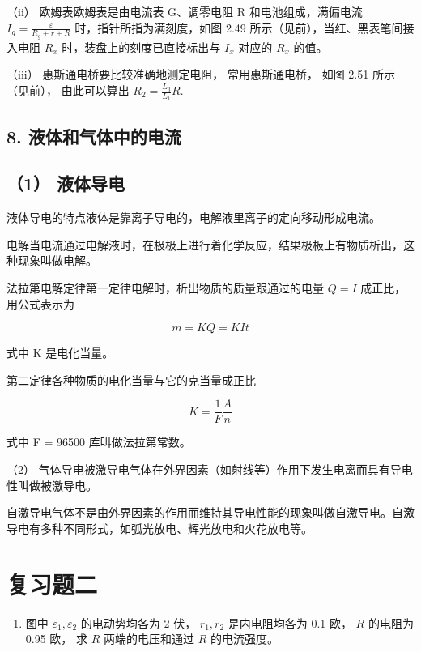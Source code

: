 （ii） 欧姆表欧姆表是由电流表 G、调零电阻 R 和电池组成，满偏电流
\(I_{g}=\frac{\varepsilon}{R_{g}+r+R}\) 时，指针所指为满刻度，如图 2.49
所示（见前），当红、黑表笔间接入电阻 \(R_{x}\)
时，装盘上的刻度已直接标出与 \(I_{x}\) 对应的 \(R_{x}\) 的值。

（iii） 惠斯通电桥要比较准确地测定电阻， 常用惠斯通电桥， 如图 2.51
所示（见前）， 由此可以算出 \(R_{2} = \frac{L_{3}}{L_{1}} R\).

\subsection{8.
液体和气体中的电流}\label{ux6db2ux4f53ux548cux6c14ux4f53ux4e2dux7684ux7535ux6d41-1}

\subsection{（1） 液体导电}\label{ux6db2ux4f53ux5bfcux7535}

液体导电的特点液体是靠离子导电的，电解液里离子的定向移动形成电流。

电解当电流通过电解液时，在极极上进行着化学反应，结果极板上有物质析出，这种现象叫做电解。

法拉第电解定律第一定律电解时，析出物质的质量跟通过的电量 \(Q = I\)
成正比，用公式表示为

\[
m = K Q = K I t
\]

式中 K 是电化当量。

第二定律各种物质的电化当量与它的克当量成正比

\[
K = \frac{1}{F} \frac{A}{n}
\]

式中 F = 96500 库叫做法拉第常数。

（2）
气体导电被激导电气体在外界因素（如射线等）作用下发生电离而具有导电性叫做被激导电。

自激导电气体不是由外界因素的作用而维持其导电性能的现象叫做自激导电。自激导电有多种不同形式，如弧光放电、辉光放电和火花放电等。

\section{复习题二}\label{ux590dux4e60ux9898ux4e8c}

\begin{enumerate}
\def\labelenumi{\arabic{enumi}.}
\tightlist
\item
  图中 \(\varepsilon_{1}, \varepsilon_{2}\) 的电动势均各为 2 伏，
  \(r_{1}, r_{2}\) 是内电阻均各为 0.1 欧， \(R\) 的电阻为 0.95 欧， 求
  \(R\) 两端的电压和通过 \(R\) 的电流强度。
\end{enumerate}

